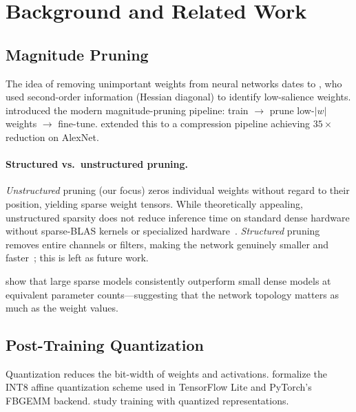 \section{Background and Related Work}
\label{sec:related}

\subsection{Magnitude Pruning}

The idea of removing unimportant weights from neural networks dates to
\citet{lecun1990optimal}, who used second-order information (Hessian diagonal)
to identify low-salience weights.
\citet{han2015learning} introduced the modern magnitude-pruning pipeline:
train $\to$ prune low-$|w|$ weights $\to$ fine-tune.
\citet{han2015deep} extended this to a compression pipeline achieving
$35\times$ reduction on AlexNet.

\paragraph{Structured vs.\ unstructured pruning.}
\emph{Unstructured} pruning (our focus) zeros individual weights without
regard to their position, yielding sparse weight tensors.
While theoretically appealing, unstructured sparsity does not reduce
inference time on standard dense hardware without sparse-BLAS kernels or
specialized hardware~\citep{gale2019state}.
\emph{Structured} pruning removes entire channels or filters, making the
network genuinely smaller and faster~\citep{li2016pruning,molchanov2017pruning};
this is left as future work.

\citet{zhu2018prune} show that large sparse models consistently outperform
small dense models at equivalent parameter counts—suggesting that the
network topology matters as much as the weight values.

\subsection{Post-Training Quantization}

Quantization reduces the bit-width of weights and activations.
\citet{jacob2018quantization} formalize the INT8 affine quantization scheme
used in TensorFlow Lite and PyTorch's FBGEMM backend.
\citet{hubara2017quantized} study training with quantized representations.

